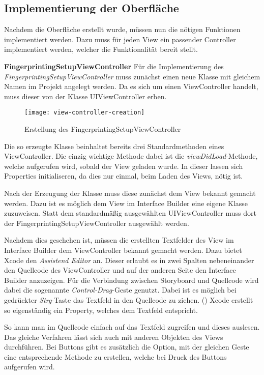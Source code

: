 \subsection{Implementierung der Oberfläche}
\label{sec:}

Nachdem die Oberfläche erstellt wurde, müssen nun die nötigen Funktionen implementiert werden. 
Dazu muss für jeden View ein passender Controller implementiert werden, welcher die Funktionalität bereit stellt.


\textbf{FingerprintingSetupViewController}
Für die Implementierung des \emph{FingerprintingSetupViewController} muss zunächst einen neue Klasse mit gleichem Namen im Projekt angelegt werden. 
Da es sich um einen ViewController handelt, muss dieser von der Klasse UIViewController erben.

\begin{figure}[htb!]
		\centering
	\texttt{[image: view-controller-creation]}
	\caption{Erstellung des FingerprintingSetupViewController}
	\label{view-controller-creation}
\end{figure}

Die so erzeugte Klasse beinhaltet bereits drei Standardmethoden eines ViewController. Die einzig wichtige Methode dabei ist die \emph{viewDidLoad}-Methode, welche aufgerufen wird, sobald der View geladen wurde. In dieser lassen sich Properties initialiseren, da dies nur einmal, beim Laden des Views, nötig ist.
 
Nach der Erzeugung der Klasse muss diese zunächst dem View bekannt gemacht werden. Dazu ist es möglich dem View im Interface Builder eine eigene Klasse zuzuweisen. Statt dem standardmäßig ausgewählten UIViewController muss dort der FingerprintingSetupViewController ausgewählt werden.

Nachdem dies geschehen ist, müssen die erstellten Textfelder des View im Interface Builder dem ViewController bekannt gemacht werden. Dazu bietet Xcode den \emph{Assistend Editor} an. Dieser erlaubt es in zwei Spalten nebeneinander den Quellcode des ViewController und auf der anderen Seite den Interface Builder anzuzeigen. Für die Verbindung zwischen Storyboard und Quellcode wird dabei die sogenannte \emph{Control-Drag}-Geste genutzt. Dabei ist es möglich bei gedrückter \emph{Strg}-Taste das Textfeld in den Quellcode zu ziehen. (\cite{cntrldrag})
Xcode erstellt so eigenständig ein Property, welches dem Textfeld entspricht.

So kann man im Quellcode einfach auf das Textfeld zugreifen und dieses auslesen. Das gleiche Verfahren lässt sich auch mit anderen Objekten des Views durchführen. Bei Buttons gibt es zusätzlich die Option, mit der gleichen Geste eine entsprechende Methode zu erstellen, welche bei Druck des Buttons aufgerufen wird.

